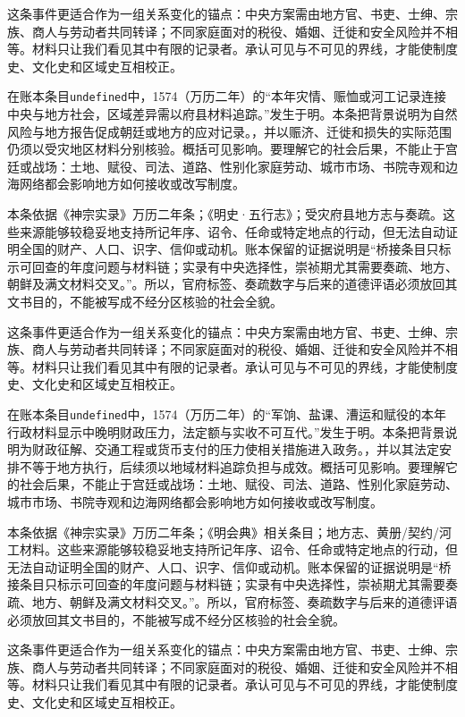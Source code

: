 这条事件更适合作为一组关系变化的锚点：中央方案需由地方官、书吏、士绅、宗族、商人与劳动者共同转译；不同家庭面对的税役、婚姻、迁徙和安全风险并不相等。材料只让我们看见其中有限的记录者。承认可见与不可见的界线，才能使制度史、文化史和区域史互相校正。

在账本条目\texttt{undefined}中，1574（万历二年）的“本年灾情、赈恤或河工记录连接中央与地方社会，区域差异需以府县材料追踪。”发生于明。本条把背景说明为自然风险与地方报告促成朝廷或地方的应对记录。，并以赈济、迁徙和损失的实际范围仍须以受灾地区材料分别核验。概括可见影响。要理解它的社会后果，不能止于宫廷或战场：土地、赋役、司法、道路、性别化家庭劳动、城市市场、书院寺观和边海网络都会影响地方如何接收或改写制度。

本条依据《神宗实录》万历二年条；《明史·五行志》；受灾府县地方志与奏疏。这些来源能够较稳妥地支持所记年序、诏令、任命或特定地点的行动，但无法自动证明全国的财产、人口、识字、信仰或动机。账本保留的证据说明是“桥接条目只标示可回查的年度问题与材料链；实录有中央选择性，崇祯期尤其需要奏疏、地方、朝鲜及满文材料交叉。”。所以，官府标签、奏疏数字与后来的道德评语必须放回其文书目的，不能被写成不经分区核验的社会全貌。

这条事件更适合作为一组关系变化的锚点：中央方案需由地方官、书吏、士绅、宗族、商人与劳动者共同转译；不同家庭面对的税役、婚姻、迁徙和安全风险并不相等。材料只让我们看见其中有限的记录者。承认可见与不可见的界线，才能使制度史、文化史和区域史互相校正。

在账本条目\texttt{undefined}中，1574（万历二年）的“军饷、盐课、漕运和赋役的本年行政材料显示中晚明财政压力，法定额与实收不可互代。”发生于明。本条把背景说明为财政征解、交通工程或货币支付的压力使相关措施进入政务。，并以其法定安排不等于地方执行，后续须以地域材料追踪负担与成效。概括可见影响。要理解它的社会后果，不能止于宫廷或战场：土地、赋役、司法、道路、性别化家庭劳动、城市市场、书院寺观和边海网络都会影响地方如何接收或改写制度。

本条依据《神宗实录》万历二年条；《明会典》相关条目；地方志、黄册/契约/河工材料。这些来源能够较稳妥地支持所记年序、诏令、任命或特定地点的行动，但无法自动证明全国的财产、人口、识字、信仰或动机。账本保留的证据说明是“桥接条目只标示可回查的年度问题与材料链；实录有中央选择性，崇祯期尤其需要奏疏、地方、朝鲜及满文材料交叉。”。所以，官府标签、奏疏数字与后来的道德评语必须放回其文书目的，不能被写成不经分区核验的社会全貌。

这条事件更适合作为一组关系变化的锚点：中央方案需由地方官、书吏、士绅、宗族、商人与劳动者共同转译；不同家庭面对的税役、婚姻、迁徙和安全风险并不相等。材料只让我们看见其中有限的记录者。承认可见与不可见的界线，才能使制度史、文化史和区域史互相校正。


